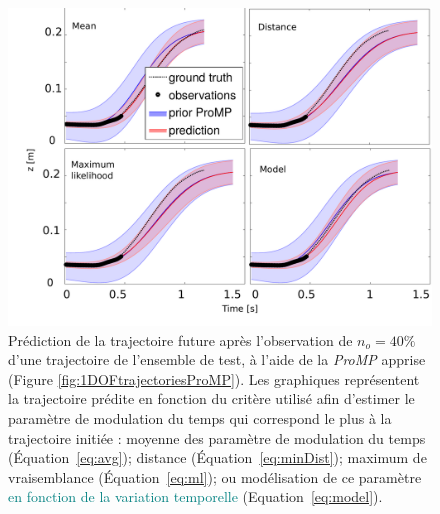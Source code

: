 \documentclass[utf8]{frontiersSCNS} %
\newcommand{\toimprove}[1]{\textcolor{teal}{#1}}
\begin{document}
\begin{figure}[h]
\centering
\includegraphics[width=15cm]{img/1DOFtrajectoriesPredictionsDurationV2.pdf}
\caption{Prédiction de la trajectoire future après l'observation de  $n_{o}=40\%$ d'une trajectoire de l'ensemble de test, à l'aide de la \textit{ProMP} apprise (Figure \ref{fig:1DOFtrajectoriesProMP}). Les graphiques représentent la trajectoire prédite en fonction du critère utilisé afin d'estimer le paramètre de modulation du temps qui correspond le plus à la trajectoire initiée : moyenne des paramètre de modulation du temps (Équation~\ref{eq:avg}); distance (Équation~\ref{eq:minDist}); maximum de vraisemblance (Équation~\ref{eq:ml}); ou modélisation de ce paramètre \toimprove{en fonction de la variation temporelle} (Equation~\ref{eq:model}).}
\label{fig:1DOFtrajectoriesPredictionsDuration}
\end{figure}


\end{document}
